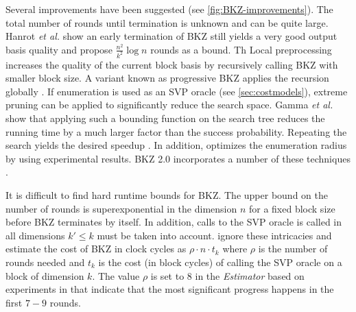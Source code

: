 Several improvements have been suggested (see \ref{fig:BKZ-improvements}). The total number of rounds until termination is unknown and can be quite large. Hanrot \textit{et al.} \cite{HPS11a} show an early termination of BKZ still yields a very good output basis quality and propose $\frac{n^2}{k^2} \log n$ rounds as a bound. Th
Local preprocessing increases the quality of the current block basis by recursively calling BKZ with smaller block size. A variant known as progressive BKZ applies the recursion globally \cite{AWHT16}. If enumeration is used as an SVP oracle (see \cref{sec:costmodels}), extreme pruning can be applied to significantly reduce the search space. Gamma \textit{et al.} show that applying such a bounding function on the search tree reduces the running time by a much larger factor than the success probability. Repeating the search yields the desired speedup \cite{GNR10}. In addition, \cite{CN11} optimizes the enumeration radius by using experimental results. BKZ 2.0 incorporates a number of these techniques \cite{CN11}.


It is difficult to find hard runtime bounds for BKZ. The upper bound on the number of rounds is superexponential in the dimension $n$ for a fixed block size \cite{HPS11a, GN08b} before BKZ terminates by itself. In addition, calls to the SVP oracle is called in all dimensions $k' \leq k$ must be taken into account. 
\citet{APS15} ignore these intricacies and estimate the cost of BKZ in clock cycles as $\rho \cdot n \cdot t_k$ where $\rho$ is the number of rounds needed and $t_k$ is the cost (in block cycles) of calling the SVP oracle on a block of dimension $k$. The value $\rho$ is set to $8$ in the \textit{Estimator} based on experiments in \cite{Chen13} that indicate that the most significant progress happens in the first $7-9$ rounds. 

